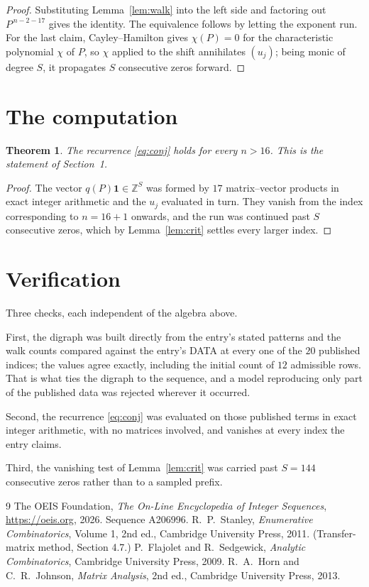 \documentclass[11pt,a4paper]{article}
\theoremstyle{plain}
\newtheorem{theorem}{Theorem}
\theoremstyle{definition}
\begin{document}
\begin{proof}
Substituting Lemma~\ref{lem:walk} into the left side and factoring out
$P^{\,n-2-17}$ gives the identity. The equivalence follows by letting the exponent
run. For the last claim, Cayley--Hamilton gives $\chi(P)=0$ for the characteristic
polynomial $\chi$ of $P$, so $\chi$ applied to the shift annihilates $(u_j)$; being monic of
degree $S$, it propagates $S$ consecutive zeros forward.
\end{proof}

\section{The computation}

\begin{theorem}
The recurrence \eqref{eq:conj} holds for every $n>16$. This is the statement of
Section~1.
\end{theorem}

\begin{proof}
The vector $q(P)\mathbf{1}\in\mathbb{Z}^{S}$ was formed by $17$ matrix--vector
products in exact integer arithmetic and the $u_j$ evaluated in turn. They vanish from the
index corresponding to $n=16+1$ onwards, and the run was continued past $S$ consecutive
zeros, which by Lemma~\ref{lem:crit} settles every larger index.
\end{proof}

\section{Verification}

Three checks, each independent of the algebra above.

First, the digraph was built directly from the entry's stated patterns and the walk counts
compared against the entry's DATA at every one of the $20$ published indices; the
values agree exactly, including the initial count of $12$ admissible rows. That is
what ties the digraph to the sequence, and a model reproducing only part of the published
data was rejected wherever it occurred.

Second, the recurrence \eqref{eq:conj} was evaluated on those published terms in exact
integer arithmetic, with no matrices involved, and vanishes at every index the entry claims.

Third, the vanishing test of Lemma~\ref{lem:crit} was carried past $S=144$ consecutive
zeros rather than to a sampled prefix.

\begin{thebibliography}{9}
 The OEIS Foundation, \emph{The On-Line Encyclopedia of Integer
Sequences}, \url{https://oeis.org}, 2026. Sequence A206996.
 R.~P.~Stanley, \emph{Enumerative Combinatorics}, Volume 1, 2nd ed.,
Cambridge University Press, 2011. (Transfer-matrix method, Section 4.7.)
 P.~Flajolet and R.~Sedgewick, \emph{Analytic Combinatorics}, Cambridge
University Press, 2009.
 R.~A.~Horn and C.~R.~Johnson, \emph{Matrix Analysis}, 2nd ed., Cambridge
University Press, 2013.
\end{thebibliography}
\end{document}
